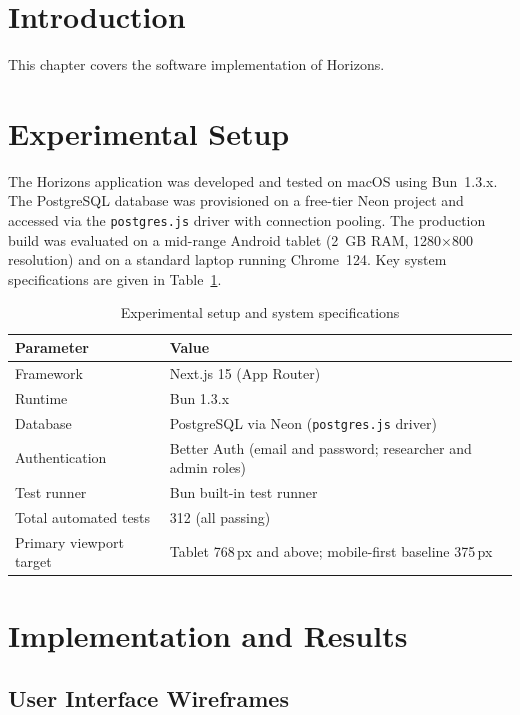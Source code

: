 \documentclass[12pt,a4paper,oneside]{report}
\begin{document}
	\section{Introduction}
	
	This chapter covers the software implementation of Horizons.
	
	\section{Experimental Setup}
	
	The Horizons application was developed and tested on macOS using Bun~1.3.x. The PostgreSQL database was provisioned on a free-tier Neon project and accessed via the \texttt{postgres.js} driver with connection pooling. The production build was evaluated on a mid-range Android tablet (2~GB RAM, 1280$\times$800 resolution) and on a standard laptop running Chrome~124. Key system specifications are given in Table~\ref{tab:setup}.
	
	\begin{table}[H]
		\caption{Experimental setup and system specifications}
		\label{tab:setup}
		\begin{tabularx}{\linewidth}{lX}
			\toprule
			\textbf{Parameter}            & \textbf{Value} \\
			\midrule
			Framework                     & Next.js 15 (App Router) \\
			Runtime                       & Bun 1.3.x \\
			Database                      & PostgreSQL via Neon (\texttt{postgres.js} driver) \\
			Authentication                & Better Auth (email and password; researcher and admin roles) \\
			Test runner                   & Bun built-in test runner \\
			Total automated tests         & 312 (all passing) \\
			Primary viewport target       & Tablet 768\,px and above; mobile-first baseline 375\,px \\
			\bottomrule
		\end{tabularx}
	\end{table}
	
	\section{Implementation and Results}

	\subsection{User Interface Wireframes}
	
\end{document}
